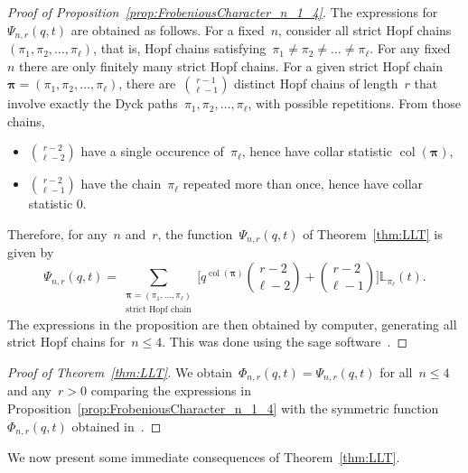 \documentclass{amsart}
\theoremstyle{definition}
\newcommand{\col}{\operatorname{col}} %
\newcommand{\bpi}{\boldsymbol \pi} %
\newcommand{\LLT}[2]{\mathbb{L}_{#1}(#2)} %
\begin{document}
\begin{proof}[Proof of Proposition~\ref{prop:FrobeniousCharacter_n_1_4}]
The expressions for~$\Psi_{n,r}(q,t)$ are obtained as follows. For a fixed~$n$, consider all strict Hopf chains $(\pi_1,\pi_2,\dots ,\pi_\ell)$, that is, 
Hopf chains satisfying~${\pi_1 \ne \pi_2 \ne \dots \ne \pi_\ell}$. For any fixed~$n$ there are only finitely many strict Hopf chains. 
For a given strict Hopf chain ${\bpi = (\pi_1,\pi_2,\dots ,\pi_\ell)}$, there are~${r-1 \choose \ell-1}$ distinct Hopf chains of length~$r$ that involve 
exactly the Dyck paths~$\pi_1, \pi_2, \dots, \pi_\ell$, with possible repetitions. From those chains, 
\begin{itemize}
\item ${r-2 \choose \ell-2}$ have a single occurence of~$\pi_\ell$, hence have collar statistic $\col(\bpi)$,
\item ${r-2 \choose \ell-1}$ have the chain~$\pi_\ell$ repeated more than once, hence have collar statistic $0$.
\end{itemize}
Therefore, for any~$n$ and~$r$, the function~$\Psi_{n,r}(q,t)$ of Theorem~\ref{thm:LLT} is given by
\[
\Psi_{n,r}(q,t) = \sum_{\substack{\bpi=(\pi_1,\dots ,\pi_\ell) \\ \text{strict Hopf chain}}} \Big[ {\textstyle q^{\col(\bpi)} \binom{r-2}{\ell-2} + \binom{r-2}{\ell-1} } \Big] \LLT{\pi_\ell}{t}.
\]
The expressions in the proposition are then obtained by computer, generating all strict Hopf chains for~$n \le 4$.
This was done using the sage software~\cite{Sage,SageCombinat}.
\end{proof}

\begin{proof}[Proof of Theorem~\ref{thm:LLT}]
We obtain~$\Phi_{n,r}(q,t) = \Psi_{n,r}(q,t)$ for all~$n \le 4$ and any~$r>0$ comparing the expressions in Proposition~\ref{prop:FrobeniousCharacter_n_1_4} with the symmetric function~$\Phi_{n,r}(q,t)$ obtained in~\cite{Bergeron-multivariateDiagonalCoinvariantSpaces}.
\end{proof}

\enlargethispage{-.5cm}
We now present some immediate consequences of Theorem~\ref{thm:LLT}.
\end{document}
